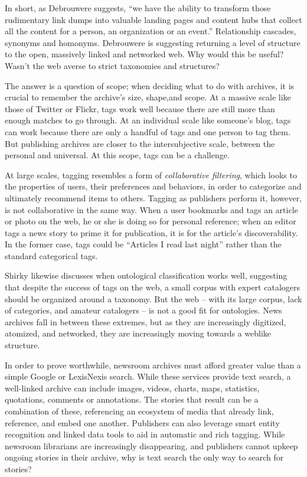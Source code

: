 In short, as Debrouwere suggests, ``we have the ability to transform those rudimentary link dumps into valuable landing pages and content hubs that collect all the content for a person, an organization or an event.'' Relationship cascades, synonyms and homonyms. Debrouwere is suggesting returning a level of structure to the open, massively linked and networked web. Why would this be useful? Wasn't the web averse to strict taxonomies and structures?

The answer is a question of scope; when deciding what to do with archives, it is crucial to remember the archive's size, shape,and scope. At a massive scale like those of Twitter or Flickr, tags work well because there are still more than enough matches to go through. At an individual scale like someone's blog, tags can work because there are only a handful of tags and one person to tag them. But publishing archives are closer to the intersubjective scale, between the personal and universal. At this scope, tags can be a challenge.

At large scales, tagging resembles a form of \emph{collaborative filtering}, which looks to the properties of users, their preferences and behaviors, in order to categorize and ultimately recommend items to others. Tagging as publishers perform it, however, is not collaborative in the same way. When a user bookmarks and tags an article or photo on the web, he or she is doing so for personal reference; when an editor tags a news story to prime it for publication, it is for the article's discoverability. In the former case, tags could be ``Articles I read last night'' rather than the standard categorical tags.

Shirky likewise discusses when ontological classification works well, suggesting that despite the success of tags on the web, a small corpus with expert catalogers should be organized around a taxonomy. But the web -- with its large corpus, lack of categories, and amateur catalogers -- is not a good fit for ontologies. News archives fall in between these extremes, but as they are increasingly digitized, atomized, and networked, they are increasingly moving towards a weblike structure.

In order to prove worthwhile, newsroom archives must afford greater value than a simple Google or LexisNexis search. While these services provide text search, a well-linked archive can include images, videos, charts, maps, statistics, quotations, comments or annotations. The stories that result can be a combination of these, referencing an ecosystem of media that already link, reference, and embed one another. Publishers can also leverage smart entity recognition and linked data tools to aid in automatic and rich tagging. While newsroom librarians are increasingly disappearing, and publishers cannot upkeep ongoing stories in their archive, why is text search the only way to search for stories?

